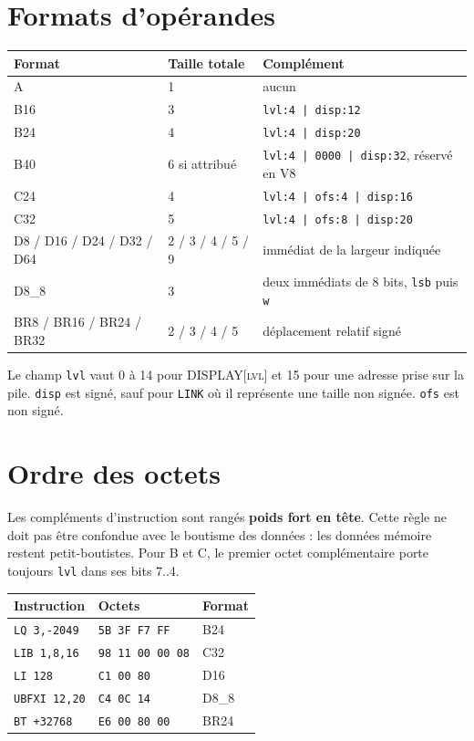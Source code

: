 \documentclass[10pt,a4paper,twoside,openany]{book}
\newcommand{\code}[1]{\texttt{#1}}
\newcommand{\reg}[1]{\textsc{#1}}
\begin{document}
\section{Formats d'opérandes}
\begin{center}
\begin{tabularx}{\linewidth}{@{}l l X@{}}
\toprule
\textbf{Format} & \textbf{Taille totale} & \textbf{Complément}\\ \midrule
A & 1 & aucun\\
B16 & 3 & \code{lvl:4 | disp:12}\\
B24 & 4 & \code{lvl:4 | disp:20}\\
B40 & 6 si attribué & \code{lvl:4 | 0000 | disp:32}, réservé en V8\\
C24 & 4 & \code{lvl:4 | ofs:4 | disp:16}\\
C32 & 5 & \code{lvl:4 | ofs:8 | disp:20}\\
D8 / D16 / D24 / D32 / D64 & 2 / 3 / 4 / 5 / 9 & immédiat de la largeur indiquée\\
D8\_8 & 3 & deux immédiats de 8 bits, \code{lsb} puis \code{w}\\
BR8 / BR16 / BR24 / BR32 & 2 / 3 / 4 / 5 & déplacement relatif signé\\
\bottomrule
\end{tabularx}
\end{center}

Le champ \code{lvl} vaut 0 à 14 pour \reg{DISPLAY[lvl]} et 15 pour une adresse prise sur la pile. \code{disp} est signé, sauf pour \texttt{LINK} où il représente une taille non signée. \code{ofs} est non signé.

\section{Ordre des octets}
Les compléments d'instruction sont rangés \textbf{poids fort en tête}. Cette règle ne doit pas être confondue avec le boutisme des données : les données mémoire restent petit-boutistes. Pour B et C, le premier octet complémentaire porte toujours \code{lvl} dans ses bits 7..4.

\begin{center}
\begin{tabular}{@{}lll@{}}
\toprule
Instruction & Octets & Format\\ \midrule
\texttt{LQ 3,-2049} & \texttt{5B 3F F7 FF} & B24\\
\texttt{LIB 1,8,16} & \texttt{98 11 00 00 08} & C32\\
\texttt{LI 128} & \texttt{C1 00 80} & D16\\
\texttt{UBFXI 12,20} & \texttt{C4 0C 14} & D8\_8\\
\texttt{BT +32768} & \texttt{E6 00 80 00} & BR24\\
\bottomrule
\end{tabular}
\end{center}
\end{document}
